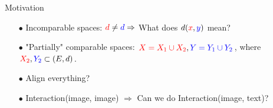 \documentclass{beamer}
\newcommand{\redx}{{\color{red}{x}}}
\newcommand{\bluey}{{\color{blue}{y}}}
\begin{document}
\begin{frame}{Motivation}
\begin{minipage}[t]{0.6\linewidth}
  \end{minipage}%
  \hfill%
  \hspace{-6cm}
  \begin{minipage}[t]{0.49\linewidth}
    \vspace{-0.2cm}
  \end{minipage}

  \vspace{-0.1cm}
  {}
  \begin{itemize}
    \item[$\bullet$] Incomparable spaces: ${\color{red}{d}} \neq {\color{blue}{d}} \Rightarrow$
    What does $d(\redx, \bluey)$ mean?
    \item[$\bullet$] "Partially" comparable spaces: ${\color{red}{X = X_1 \cup X_2}}, {\color{blue}{Y = Y_1 \cup Y_2}}$,
    where ${\color{red}{X_2}}, {\color{blue}{Y_2}} \subset (E, d)$.
    \item[$\bullet$] Align everything?
    \item[$\bullet$] Interaction(image, image) $\Rightarrow$ Can we do Interaction(image, text)?
  \end{itemize}


\end{frame}
\end{document}
